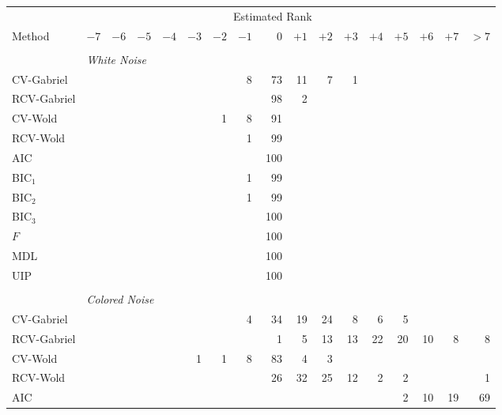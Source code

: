 \begin{table}
    \tiny
    \centering    
    \begin{tabular}{lrrrrrrrrrrrrrrrr}
        \toprule
        &\multicolumn{15}{c}{\scriptsize{Estimated Rank}} \\
        \cmidrule{2-17}
        \scriptsize{Method}
            & $-7$ & $-6$ & $-5$ & $-4$ & $-3$ & $-2$ & $-1$ 
            & $\phantom{+}0$ 
            & $+1$ & $+2$ & $+3$ & $+4$ & $+5$ & $+6$ & $+7$ & $> 7$ \\
        \midrule
        \\
        &\multicolumn{16}{l}{\scriptsize{\textit{White Noise}}} \\
CV-Gabriel &  &  &  &  &  &  &  8 &  73 &  11 &  7 &  1 &  &  &  &  & \\ 
 RCV-Gabriel &  &  &  &  &  &  &  &  98 &  2 &  &  &  &  &  &  & \\ 
 CV-Wold &  &  &  &  &  &  1 &  8 &  91 &  &  &  &  &  &  &  & \\ 
 RCV-Wold &  &  &  &  &  &  &  1 &  99 &  &  &  &  &  &  &  & \\ 
 AIC &  &  &  &  &  &  &  &  100 &  &  &  &  &  &  &  & \\ 
 BIC$_1$ &  &  &  &  &  &  &  1 &  99 &  &  &  &  &  &  &  & \\ 
 BIC$_2$ &  &  &  &  &  &  &  1 &  99 &  &  &  &  &  &  &  & \\ 
 BIC$_3$ &  &  &  &  &  &  &  &  100 &  &  &  &  &  &  &  & \\ 
 $F$ &  &  &  &  &  &  &  &  100 &  &  &  &  &  &  &  & \\ 
 MDL &  &  &  &  &  &  &  &  100 &  &  &  &  &  &  &  & \\ 
 UIP &  &  &  &  &  &  &  &  100 &  &  &  &  &  &  &  & \\ 
         \\
        &\multicolumn{16}{l}{\scriptsize{\textit{Colored Noise}}} \\
CV-Gabriel &  &  &  &  &  &  &  4 &  34 &  19 &  24 &  8 &  6 &  5 &  &  & \\ 
 RCV-Gabriel &  &  &  &  &  &  &  &  1 &  5 &  13 &  13 &  22 &  20 &  10 &  8 &  8\\ 
 CV-Wold &  &  &  &  &  1 &  1 &  8 &  83 &  4 &  3 &  &  &  &  &  & \\ 
 RCV-Wold &  &  &  &  &  &  &  &  26 &  32 &  25 &  12 &  2 &  2 &  &  &  1\\ 
 AIC &  &  &  &  &  &  &  &  &  &  &  &  &  2 &  10 &  19 &  69\\ 

\end{tabular}
\end{table}
